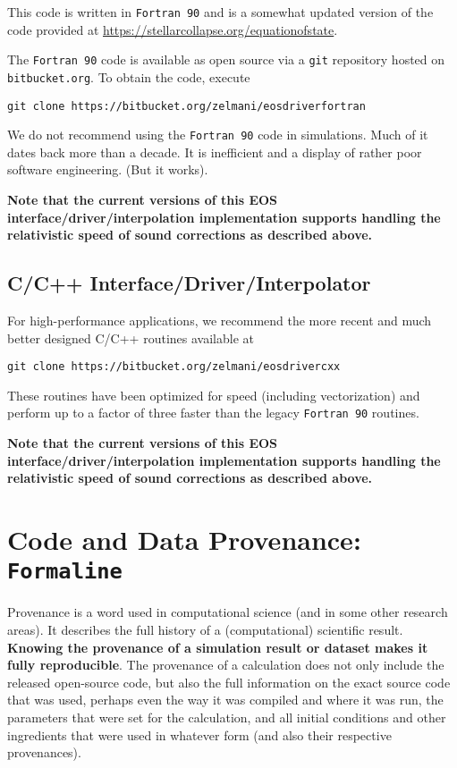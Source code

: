 \documentclass[letterpaper,11pt]{refart}
\begin{document}
This code is written in \texttt{Fortran 90} and is a somewhat updated
version of the code provided at
\url{https://stellarcollapse.org/equationofstate}.

The \texttt{Fortran 90} code is available as open source via a
\texttt{git} repository hosted on \texttt{bitbucket.org}. To obtain
the code, execute

\noindent \texttt{git clone https://bitbucket.org/zelmani/eosdriverfortran}

We do not recommend using the \texttt{Fortran 90} code in simulations.
Much of it dates back more than a decade. It is inefficient and a
display of rather poor software engineering. (But it works).

\textbf{Note that the current versions of this EOS
  interface/driver/interpolation implementation supports handling the
  relativistic speed of sound corrections as described above.}


\subsection{C/C++ Interface/Driver/Interpolator}

For high-performance applications, we recommend the more recent and much
better designed C/C++ routines available at


\noindent \texttt{git clone https://bitbucket.org/zelmani/eosdrivercxx}

These routines have been optimized for speed (including vectorization)
and perform up to a factor of three faster than the legacy
\texttt{Fortran 90} routines.

\textbf{Note that the current versions of this EOS
  interface/driver/interpolation implementation supports handling the
  relativistic speed of sound corrections as described above.}

\section{Code and Data Provenance: \texttt{Formaline}}
\label{sec:formaline}

Provenance is a word used in computational science (and in some other
research areas). It describes the full history of a (computational)
scientific result. \textbf{Knowing the provenance of a simulation
  result or dataset makes it fully reproducible}. The provenance of a
calculation does not only include the released open-source code, but
also the full information on the exact source code that was used,
perhaps even the way it was compiled and where it was run, the
parameters that were set for the calculation, and all initial
conditions and other ingredients that were used in whatever form (and
also their respective provenances).
\end{document}
